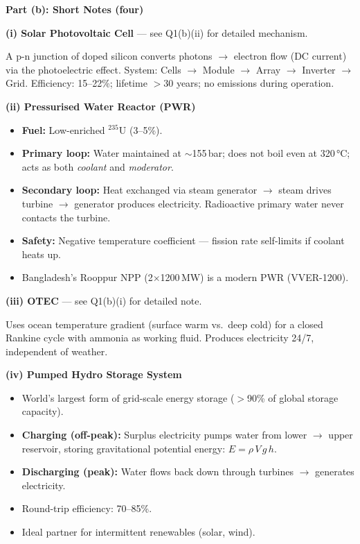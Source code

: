 \documentclass[12pt,a3paper]{article}
\begin{document}
\begin{enumerate}
\begin{tcolorbox}[enhanced,breakable,ansbox,colback=cA!4,colframe=cA,
  boxrule=0.8pt,arc=5pt,
  title={\textbf{Answer}},fonttitle=\bfseries\color{white},colbacktitle=cA]
\hrulefill

\textbf{Part (b): Short Notes (four)}

\medskip
\textbf{(i) Solar Photovoltaic Cell} — see Q1(b)(ii) for detailed mechanism.

A p-n junction of doped silicon converts photons $\to$ electron flow (DC current) via the photoelectric effect. System: Cells $\to$ Module $\to$ Array $\to$ Inverter $\to$ Grid. Efficiency: 15--22\%; lifetime $>$30 years; no emissions during operation.

\medskip
\textbf{(ii) Pressurised Water Reactor (PWR)}
\begin{itemize}[leftmargin=1.5em,itemsep=2pt]
  \item \textbf{Fuel:} Low-enriched ${}^{235}$U (3--5\%).
  \item \textbf{Primary loop:} Water maintained at $\sim$155\,bar; does not boil even at 320\,°C; acts as both \emph{coolant} and \emph{moderator}.
  \item \textbf{Secondary loop:} Heat exchanged via steam generator $\to$ steam drives turbine $\to$ generator produces electricity. Radioactive primary water never contacts the turbine.
  \item \textbf{Safety:} Negative temperature coefficient — fission rate self-limits if coolant heats up.
  \item Bangladesh's Rooppur NPP (2$\times$1200\,MW) is a modern PWR (VVER-1200).
\end{itemize}

\medskip
\textbf{(iii) OTEC} — see Q1(b)(i) for detailed note.

Uses ocean temperature gradient (surface warm vs.\ deep cold) for a closed Rankine cycle with ammonia as working fluid. Produces electricity 24/7, independent of weather.

\medskip
\textbf{(iv) Pumped Hydro Storage System}
\begin{itemize}[leftmargin=1.5em,itemsep=2pt]
  \item World's largest form of grid-scale energy storage ($>$90\% of global storage capacity).
  \item \textbf{Charging (off-peak):} Surplus electricity pumps water from lower $\to$ upper reservoir, storing gravitational potential energy: $E = \rho\,V\,g\,h$.
  \item \textbf{Discharging (peak):} Water flows back down through turbines $\to$ generates electricity.
  \item Round-trip efficiency: 70--85\%.
  \item Ideal partner for intermittent renewables (solar, wind).
\end{itemize}


\end{tcolorbox}
\end{enumerate}
\end{document}
